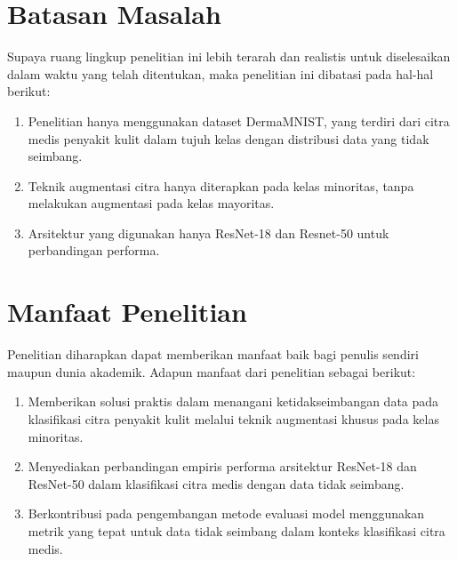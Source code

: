 
\section{Batasan Masalah} \label{I.Batasan}
Supaya ruang lingkup penelitian ini lebih terarah dan realistis untuk 
diselesaikan dalam waktu yang telah ditentukan, maka penelitian ini 
dibatasi pada hal-hal berikut: \par

\begin{enumerate}
    \item Penelitian hanya menggunakan dataset DermaMNIST, yang terdiri dari citra medis penyakit kulit dalam tujuh kelas dengan distribusi data yang tidak seimbang.
    \item Teknik augmentasi citra hanya diterapkan pada kelas minoritas, tanpa melakukan augmentasi pada kelas mayoritas.
    \item Arsitektur yang digunakan hanya ResNet-18 dan Resnet-50 untuk perbandingan performa.
\end{enumerate}


\section{Manfaat Penelitian} \label{I.Manfaat}
Penelitian diharapkan dapat memberikan manfaat baik bagi penulis sendiri 
maupun dunia akademik. Adapun manfaat dari penelitian sebagai berikut: \par

\begin{enumerate}
    \item Memberikan solusi praktis dalam menangani ketidakseimbangan data pada klasifikasi citra penyakit kulit melalui teknik augmentasi khusus pada kelas minoritas.
    \item Menyediakan perbandingan empiris performa arsitektur ResNet-18 dan ResNet-50 dalam klasifikasi citra medis dengan data tidak seimbang.
    \item Berkontribusi pada pengembangan metode evaluasi model menggunakan metrik yang tepat untuk data tidak seimbang dalam konteks klasifikasi citra medis.
\end{enumerate}

